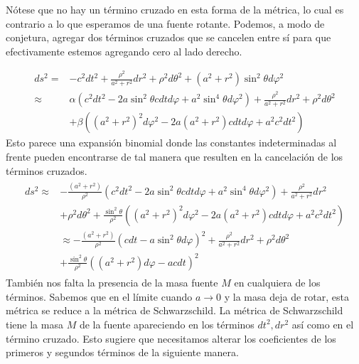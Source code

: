 Nótese que no hay un término cruzado en esta forma de la métrica, lo cual es contrario a lo que esperamos de una fuente rotante.
Podemos, a modo de conjetura, agregar dos términos cruzados que se cancelen entre sí para que efectivamente estemos agregando cero al lado derecho.

\begin{align}
    d s^2=  & -c^2 d t^2+\frac{\rho^2}{a^2+r^2} d r^2+\rho^2 d \theta^2+\left(a^2+r^2\right) \sin ^2 \theta d \varphi^2                                      \\
    \approx & \alpha \left(c^2 d t^2-2 a \sin ^2 \theta c d t d \varphi+a^2 \sin ^4 \theta d \varphi^2\right)+\frac{\rho^2}{a^2+r^2} d r^2+\rho^2 d \theta^2 \\
            & +\beta \left(\left(a^2+r^2\right)^2 d \varphi^2-2 a\left(a^2+r^2\right) c d t d \varphi+a^2 c^2 d t^2\right)
\end{align}
Esto parece una expansión binomial donde las constantes indeterminadas al frente pueden encontrarse de tal manera que resulten en la cancelación de los términos cruzados.
\begin{align}
    \begin{aligned}
        d s^2 \approx & -\frac{\left(a^2+r^2\right)}{\rho^2}\left(c^2 d t^2-2 a \sin ^2 \theta c d t d \varphi+a^2 \sin ^4 \theta d \varphi^2\right)+\frac{\rho^2}{a^2+r^2} d r^2 \\
                      & +\rho^2 d \theta^2+\frac{\sin ^2 \theta}{\rho^2}\left(\left(a^2+r^2\right)^2 d \varphi^2-2 a\left(a^2+r^2\right) c d t d \varphi+a^2 c^2 d t^2\right)     \\
                      & \approx  -\frac{\left(a^2+r^2\right)}{\rho^2}\left(c d t-a \sin ^2 \theta d \varphi\right)^2+\frac{\rho^2}{a^2+r^2} d r^2+\rho^2 d \theta^2               \\
                      & +\frac{\sin ^2 \theta}{\rho^2}\left(\left(a^2+r^2\right) d \varphi-a c d t\right)^2
    \end{aligned}
\end{align}
También nos falta la presencia de la masa fuente $M$ en cualquiera de los términos. Sabemos que en el límite cuando $a \rightarrow 0$ y la masa deja de rotar, esta métrica se reduce a la métrica de Schwarzschild.
La métrica de Schwarzschild tiene la masa $M$ de la fuente apareciendo en los términos $d t^2, d r^2$ así como en el término cruzado. Esto sugiere que necesitamos alterar los coeficientes de los primeros y segundos términos de la siguiente manera.

